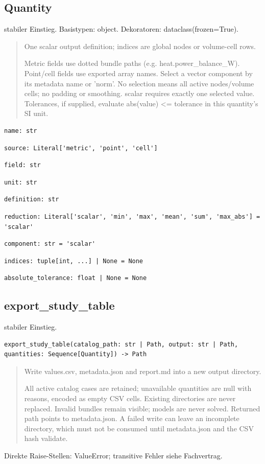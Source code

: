 \subsection{Quantity}
stabiler Einstieg.
Basistypen: object. Dekoratoren: dataclass(frozen=True).
\begin{quote}
One scalar output definition; indices are global nodes or volume-cell rows.\par Metric fields use dotted bundle paths (e.g. heat.power\_balance\_W). Point/cell fields use exported array names. Select a vector component by its metadata name or 'norm'. No selection means all active nodes/volume cells; no padding or smoothing. scalar requires exactly one selected value. Tolerances, if supplied, evaluate abs(value) <= tolerance in this quantity's SI unit.
\end{quote}
\begin{lstlisting}
name: str
\end{lstlisting}
\begin{lstlisting}
source: Literal['metric', 'point', 'cell']
\end{lstlisting}
\begin{lstlisting}
field: str
\end{lstlisting}
\begin{lstlisting}
unit: str
\end{lstlisting}
\begin{lstlisting}
definition: str
\end{lstlisting}
\begin{lstlisting}
reduction: Literal['scalar', 'min', 'max', 'mean', 'sum', 'max_abs'] = 'scalar'
\end{lstlisting}
\begin{lstlisting}
component: str = 'scalar'
\end{lstlisting}
\begin{lstlisting}
indices: tuple[int, ...] | None = None
\end{lstlisting}
\begin{lstlisting}
absolute_tolerance: float | None = None
\end{lstlisting}
\subsection{export\_study\_table}
stabiler Einstieg.
\begin{lstlisting}
export_study_table(catalog_path: str | Path, output: str | Path, quantities: Sequence[Quantity]) -> Path
\end{lstlisting}
\begin{quote}
Write values.csv, metadata.json and report.md into a new output directory.\par All active catalog cases are retained; unavailable quantities are null with reasons, encoded as empty CSV cells. Existing directories are never replaced. Invalid bundles remain visible; models are never solved. Returned path points to metadata.json. A failed write can leave an incomplete directory, which must not be consumed until metadata.json and the CSV hash validate.
\end{quote}
Direkte Raise-Stellen: ValueError; transitive Fehler siehe Fachvertrag.
